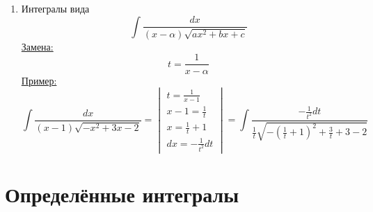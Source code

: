 \documentclass[12pt]{article}
\begin{document}
\begin{enumerate}
        \item Интегралы вида
        \[ \int \frac{dx}{(x-\alpha)\sqrt{ax^2 + bx + c}} \]
        \underline{Замена:} 
        \[ \boxed{t = \frac{1}{x-\alpha}} \]
        \underline{Пример:}
        \[ \int \frac{dx}{(x-1)\sqrt{-x^2+3x-2}} = \begin{vmatrix}
            t = \frac{1}{x-1}\\
            x - 1 = \frac{1}{t}\\
            x = \frac{1}{t} + 1\\
            dx = -\frac{1}{t^2}dt
        \end{vmatrix} = \int \frac{-\frac{1}{t^2}dt}{\frac{1}{t}\sqrt{-\left( \frac{1}{t} + 1 \right)^2 + \frac{3}{t} + 3 - 2}} \]
    \end{enumerate}

    \section{Определённые интегралы}
\end{document}
